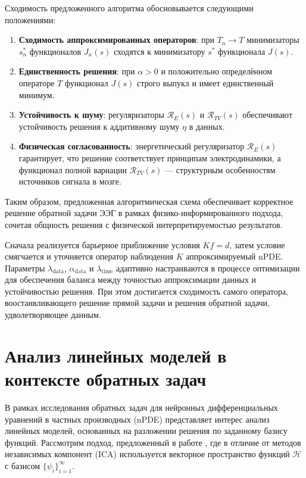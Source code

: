 \documentclass[a4paper,14pt,oneside,openany]{extarticle}
\begin{document}
Сходимость предложенного алгоритма обосновывается следующими положениями:
\begin{enumerate}
    \item \textbf{Сходимость аппроксимированных операторов}: при $T_n \to T$ минимизаторы $s_n^*$ функционалов $J_n(s)$ сходятся к минимизатору $s^*$ функционала $J(s)$.
    \item \textbf{Единственность решения}: при $\alpha > 0$ и положительно определённом операторе $T$ функционал $J(s)$ строго выпукл и имеет единственный минимум.
    \item \textbf{Устойчивость к шуму}: регуляризаторы $\mathcal{R}_E(s)$ и $\mathcal{R}_{TV}(s)$ обеспечивают устойчивость решения к аддитивному шуму $\eta$ в данных.
    \item \textbf{Физическая согласованность}: энергетический регуляризатор $\mathcal{R}_E(s)$ гарантирует, что решение соответствует принципам электродинамики, а функционал полной вариации $\mathcal{R}_{TV}(s)$ --- структурным особенностям источников сигнала в мозге.
\end{enumerate}

Таким образом, предложенная алгоритмическая схема обеспечивает корректное решение обратной задачи ЭЭГ в рамках физико-информированного подхода, 
сочетая общность решения с физической интерпретируемостью результатов.

Сначала реализуется барьерное приближение условия $Kf=d$, затем условие смягчается и уточняется оператор наблюдения $K$ аппроксимируемый nPDE. Параметры $\lambda_{\mathrm{data}}$, 
$\alpha_{\mathrm{data}}$ и $\lambda_{\mathrm{time}}$ адаптивно 
настраиваются в процессе оптимизации для обеспечения баланса между точностью аппроксимации данных и устойчивостью решения. При этом достигается сходимость самого оператора, воостанвливающего
решение прямой задачи и решения обратной задачи, удволетворяющее данным.

\newpage
\section{Анализ линейных моделей в контексте обратных задач}

В рамках исследования обратных задач для нейронных дифференциальных уравнений в частных производных (nPDE) представляет интерес анализ линейных моделей, основанных на разложении решения по заданному базису функций. Рассмотрим подход, предложенный в работе \cite{Palummo2024}, где в отличие от методов независимых компонент (ICA) используется векторное пространство функций $\mathcal{H}$ с базисом $\{\psi_i\}_{i=1}^\infty$.
\end{document}
